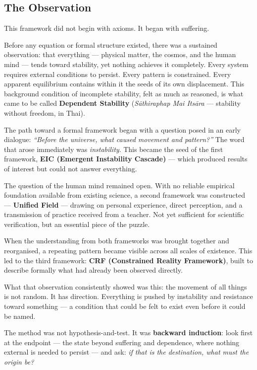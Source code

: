 \documentclass[12pt, a4paper]{article}
\begin{document}
\subsection*{The Observation}

This framework did not begin with axioms. It began with suffering.

Before any equation or formal structure existed, there was a sustained observation: that
everything --- physical matter, the cosmos, and the human mind --- tends toward stability,
yet nothing achieves it completely. Every system requires external conditions to persist.
Every pattern is constrained. Every apparent equilibrium contains within it the seeds of
its own displacement. This background condition of incomplete stability, felt as much as
reasoned, is what came to be called \textbf{Dependent Stability}
(\textit{S\={a}thiraphap Mai Its\=ara} --- stability without freedom, in Thai).

The path toward a formal framework began with a question posed in an early dialogue:
\textit{``Before the universe, what caused movement and pattern?''} The word that arose
immediately was \textit{instability}. This became the seed of the first framework,
\textbf{EIC (Emergent Instability Cascade)} --- which produced results of interest
but could not answer everything.

The question of the human mind remained open. With no reliable empirical foundation
available from existing science, a second framework was constructed ---
\textbf{Unified Field} --- drawing on personal experience, direct perception, and a
transmission of practice received from a teacher. Not yet sufficient for scientific
verification, but an essential piece of the puzzle.

When the understanding from both frameworks was brought together and reorganised, a
repeating pattern became visible across all scales of existence. This led to the third
framework: \textbf{CRF (Constrained Reality Framework)}, built to describe formally
what had already been observed directly.

What that observation consistently showed was this: the movement of all things is not
random. It has direction. Everything is pushed by instability and resistance toward
something --- a condition that could be felt to exist even before it could be named.

The method was not hypothesis-and-test. It was \textbf{backward induction}: look first
at the endpoint --- the state beyond suffering and dependence, where nothing external is
needed to persist --- and ask: \textit{if that is the destination, what must the origin be?}
\end{document}
